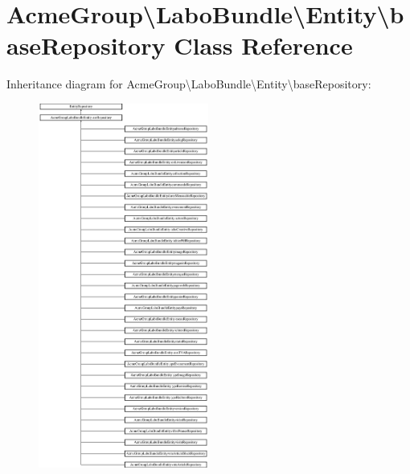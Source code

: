 \hypertarget{class_acme_group_1_1_labo_bundle_1_1_entity_1_1base_repository}{\section{Acme\+Group\textbackslash{}Labo\+Bundle\textbackslash{}Entity\textbackslash{}base\+Repository Class Reference}
\label{class_acme_group_1_1_labo_bundle_1_1_entity_1_1base_repository}
}
Inheritance diagram for Acme\+Group\textbackslash{}Labo\+Bundle\textbackslash{}Entity\textbackslash{}base\+Repository\+:\begin{figure}[H]
\begin{center}
\leavevmode
\includegraphics[height=12.000000cm]{class_acme_group_1_1_labo_bundle_1_1_entity_1_1base_repository}
\end{center}
\end{figure}
